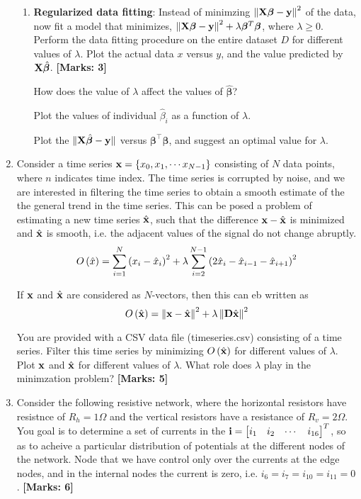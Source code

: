 \documentclass[12pt]{article}
\def\mf{\ensuremath\mathbf}
\def\lp{\ensuremath\left(}
\def\rp{\ensuremath\right)}
\def\lV{\ensuremath\left\lVert}
\def\rV{\ensuremath\right\rVert}
\def\lc{\ensuremath\left\{}
\def\rc{\ensuremath\right\}}
\def\bmx{\ensuremath\begin{bmatrix*}[r]}
\def\emx{\ensuremath\end{bmatrix*}}
\begin{document}
\begin{enumerate}
\begin{enumerate}
        \item \textbf{Regularized data fitting}: Instead of minimzing $\lV\mf{X}\bm{\beta} - \mf{y}\rV^2$ of the data, now fit a model that minimizes, $\lV\mf{X}\bm{\beta} - \mf{y}\rV^2 + \lambda\bm{\beta}^T\bm{\beta}$, where $\lambda \geq 0$. Perform the data fitting procedure on the entire dataset $D$ for different values of $\lambda$. Plot the actual data $x$ versus $y$, and the value predicted by $\mf{X}\hat{\bm{\beta}}$. \textbf{[Marks: 3]}
        
        How does the value of $\lambda$ affect the values of $\hat{\bm{\beta}}$?
        
        Plot the values of individual $\hat{\beta}_i$ as a function of $\lambda$.

        Plot the $\Vert \mf{X}\hat{\bm{\beta}} - \mf{y}\Vert$ versus $\bm{\beta}^\top\bm{\beta}$, and suggest an optimal value for $\lambda$.
    \end{enumerate}

    \item Consider a time series $\mf{x} = \lc x_0, x_1,\cdots x_{N-1} \rc$ consisting of $N$ data points, where $n$ indicates time index. The time series is corrupted by noise, and we are interested in filtering the time series to obtain a smooth estimate of the the general trend in the time series. This can be posed a problem of estimating a new time series $\hat{\mf{x}}$, such that the difference $\mf{x} - \hat{\mf{x}}$ is minimized and $\hat{\mf{x}}$ is smooth, i.e. the adjacent values of the signal do not change abruptly. 
    \[ O\lp \hat{x} \rp = \sum_{i = 1}^{N} \lp x_i - \hat{x}_i \rp^2 + \lambda \sum_{i = 2}^{N-1} \lp 2 \hat{x}_i - \hat{x}_{i-1} - \hat{x}_{i+1} \rp^2 \]

    If $\mf{x}$ and $\hat{\mf{x}}$ are considered as $N$-vectors, then this can eb written as 
    \[ O\lp \hat{\mf{x}} \rp = \lV \mf{x} - \hat{\mf{x}} \rV^2 + \lambda \lV \mf{D}\hat{\mf{x}} \rV^2 \]

    You are provided with a CSV data file (timeseries.csv) consisting of a time series. Filter this time series by minimizing $O\lp\hat{\mf{x}}\rp$ for different values of $\lambda$. Plot $\mf{x}$ and $\hat{\mf{x}}$ for different values of $\lambda$. What role does $\lambda$ play in the minimzation problem? \textbf{[Marks: 5]}

    \item Consider the following resistive network, where the horizontal resistors have resistnce of $R_h = 1\Omega$ and the vertical resistors have a resistance of $R_v = 2\Omega$. You goal is to determine a set of currents in the $\mf{i} = \bmx i_1 & i_2 & \cdots & i_{16}\emx^T$, so as to acheive a particular distribution of potentials at the different nodes of the network. Node that we have control only over the currents at the edge nodes, and in the internal nodes the current is zero, i.e. $i_6 = i_7 = i_{10} = i_{11} = 0$. \textbf{[Marks: 6]}


\end{enumerate}
\end{document}
